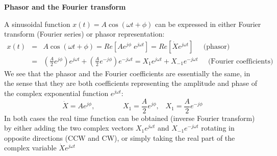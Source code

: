 


{\bf Phasor and the Fourier transform}

A sinusoidal function $x(t)=A\cos(\omega t+\phi)$ can be expressed in
either Fourier transform (Fourier series) or phasor representation:
\begin{eqnarray}
  x(t)&=&A\cos(\omega t+\phi)=Re[Ae^{j\phi}\;e^{j\omega t}]=Re[\dot{X} e^{j\omega t}]
  \;\;\;\;\;\mbox{(phasor)}
  \nonumber \\
  &=&\left(\frac{A}{2}e^{j\phi}\right)e^{j\omega t}
  +\left(\frac{A}{2}e^{-j\phi}\right)e^{-j\omega t}
  =X_1 e^{j\omega t}+X_{-1}e^{-j\omega t}\;\;\;\;\;\mbox{(Fourier coefficients)}
\nonumber 
\end{eqnarray}
We see that the phasor and the Fourier coefficients are essentially 
the same, in the sense that they are both coefficients representing the 
amplitude and phase of the complex exponential function $e^{j\omega t}$:
\[
\dot{X}=Ae^{j\phi},\;\;\;\;\;\;\;\;\;\;\;\;\;\;
X_1=\frac{A}{2}e^{j\phi},\;\;\;X_1=\frac{A}{2}e^{-j\phi}
\]
In both cases the real time function can be obtained (inverse Fourier
transform) by either adding the two complex vectors $X_1e^{j\omega t}$ and 
$X_{-1}e^{-j\omega t}$ rotating in opposite directions (CCW and CW), or simply
taking the real part of the complex variable $\dot{X}e^{j\omega t}$

\begin{comment}
According to the Fourier theory, any time function (satisfying certain 
mathematical conditions) $x(t)$ can be decomposed into a linear combination
of sinusoidal (complex exponential) components:
\begin{itemize}
\item If $x(t)=x(t+T)$ is periodical with period $T$, it can be Fourier
  expanded into
  \[
  x_T(t)=\sum_{k=-\infty}^\infty X[k] e^{jk\omega_0t},\;\;\;\;\;\;(\omega_0=2\pi/T)
  \]
  where $X[k]$ is the complex coefficient of the kth frequency component
  \[
  X[k]=\frac{1}{T}\int_T x_T(t)e^{-jk\omega_0t}
  \]
  When $x_T(t)$ is real, the above becomes:
  \[
  x_T(t)=X[0]+2\sum_{k=1}^\infty |X[k]|\cos(k\omega_0 t+\angle X[k])
  \]
\item If $x(t)$ is not periodical, i.e., $T=\infty$, it can be expressed as
  \[
  x(t)=\frac{1}{2\pi} \int X(\omega) e^{j\omega t} d\omega
  \]
  where $X(\omega)$ is the {\em Fourier spectrum} of the signal representing
  how the signal energy is distributed as a function of continuous frequency:
  \[
  X(\omega)=\int_{-\infty}^\infty x(t) e^{-j\omega t}\;dt
  \]
\end{itemize}
\end{comment}


